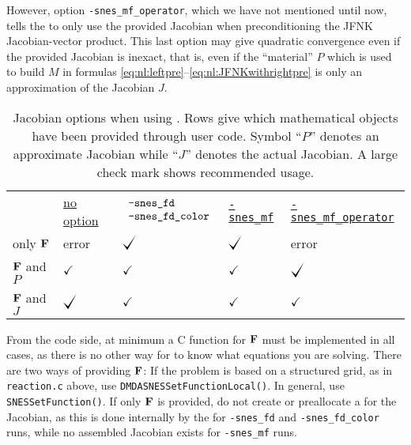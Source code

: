 However, option \texttt{-snes\_mf\_operator}, which we have not mentioned until now, tells the \pSNES to only use the provided Jacobian when preconditioning the JFNK Jacobian-vector product.  This last option may give quadratic convergence even if the provided Jacobian is inexact, that is, even if the ``material'' $P$ which is used to build $M$ in formulas \eqref{eq:nl:leftpre}--\eqref{eq:nl:JFNKwithrightpre} is only an approximation of the Jacobian $J$.

\begin{table}
\begin{tabular}{lllll}
 &\underline{\small no option}\hspace{0.0in} & \underline{\small\hspace{-0.05in}$\begin{array}{ll} \text{\texttt{-snes\_fd}} \\ \text{\texttt{-snes\_fd\_color}}\end{array}$} & \underline{\small \texttt{-snes\_mf}} & \underline{\small \texttt{-snes\_mf\_operator}} \\
only $\mathbf{F}$      & error           & $\bigcheckmark$ & $\bigcheckmark$ & error \\
$\mathbf{F}$ and $P$   & $\checkmark$ & $\checkmark$    & $\checkmark$    & $\bigcheckmark$ \\
$\mathbf{F}$ and $J$   & $\bigcheckmark$ & $\checkmark$    & $\checkmark$    & $\checkmark$
\end{tabular}
\caption{Jacobian options when using \pSNES.  Rows give which mathematical objects have been provided through user code.  Symbol ``$P$'' denotes an approximate Jacobian while ``$J$'' denotes the actual Jacobian.  A large check mark shows recommended usage.} \label{tab:snesjacobianoptions:needed}
\end{table}

From the code side, at minimum a C function for $\mathbf{F}$ must be implemented in all cases, as there is no other way for \PETSc to know what equations you are solving.   There are two ways of providing $\mathbf{F}$:  If the problem is based on a structured grid, as in \texttt{reaction.c} above, use \texttt{DMDASNESSetFunctionLocal()}.  In general, use \texttt{SNESSetFunction()}.  If only $\mathbf{F}$ is provided, do not create or preallocate a \pMat for the Jacobian, as this is done internally by the \pSNES for \texttt{-snes\_fd} and \texttt{-snes\_fd\_color} runs, while no assembled Jacobian \pMat exists for \texttt{-snes\_mf} runs.

